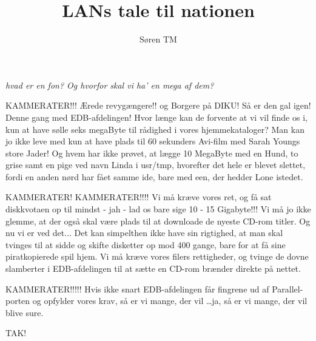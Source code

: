 \documentclass[11pt,a4paper]{article}
\title{LANs tale til nationen}
\author{Søren TM}
\begin{document}
\maketitle

\begin{sketch}
\begin{roles}
\end{roles}

\begin{props}
   \emph{hvad er en fon? Og hvorfor skal vi ha' en mega af dem?}
\end{props}  
  
  KAMMERATER!!! Ærede revygængere!! og Borgere på DIKU!  Så er den gal igen! 
  Denne  gang med EDB-afdelingen! Hvor længe kan de forvente at vi vil finde 
  os i, kun at have sølle seks megaByte til rådighed i vores hjemmekataloger? 
  Man kan jo ikke leve med kun at have plads til 60 sekunders Avi-film med
  Sarah Youngs store Jader! Og hvem har ikke prøvet, at lægge 10 MegaByte
  med en Hund, to grise samt en pige ved navn Linda i usr/tmp, hvorefter
  det hele er blevet slettet, fordi en anden nørd har fået samme ide, bare
  med een, der hedder Lone istedet.
  
  
  KAMMERATER! KAMMERATER!!!!
  Vi må kræve vores ret, og få sat diskkvotaen op til mindst - jah - lad os
  bare sige 10 - 15 Gigabyte!!! Vi må jo ikke glemme, at der også skal
  være plads til at downloade de nyeste CD-rom titler. Og nu vi er ved
  det... Det kan simpelthen ikke have sin rigtighed, at man skal tvinges
  til at sidde og skifte disketter op mod 400 gange, bare for at få sine
  piratkopierede spil hjem. Vi må kræve vores filers rettigheder, og tvinge de
  dovne slamberter i EDB-afdelingen til at sætte en CD-rom brænder direkte
  på nettet.

  
  KAMMERATER!!!!! Hvis ikke snart EDB-afdelingen får fingrene ud af
  Parallel-porten og opfylder vores krav, så er vi mange, der vil \ldots ja, så
  er vi mange, der vil blive sure.
  

TAK! 

\end{sketch}
\end{document}
